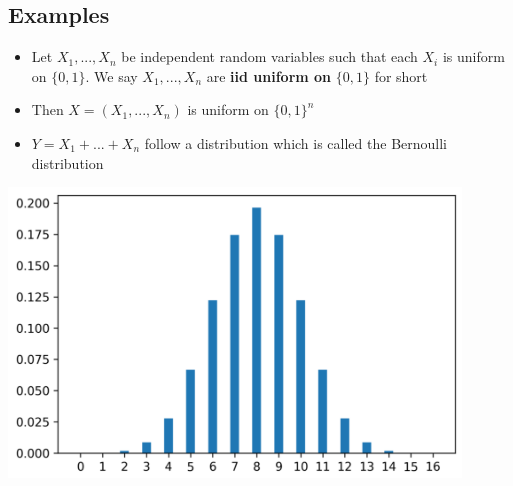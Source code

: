 		\subsection{Examples}
			\begin{itemize}
				\item Let $X_1,...,X_n$ be independent random variables such that each $X_i$ is uniform on $\{ 0,1 \}$.
				We say $X_1,...,X_n$ are \textbf{iid uniform on} $\{0,1\}$ for short
				\item Then $X = (X_1,...,X_n)$ is uniform on $\{0,1\}^n$
				\item $Y = X_1 + ... + X_n$ follow a distribution which is called the Bernoulli distribution
			\end{itemize}
			\begin{center}
				\includegraphics[width=120mm]{Graphics/Probability Theory/Examples1.png}\newline
			\end{center}
		
